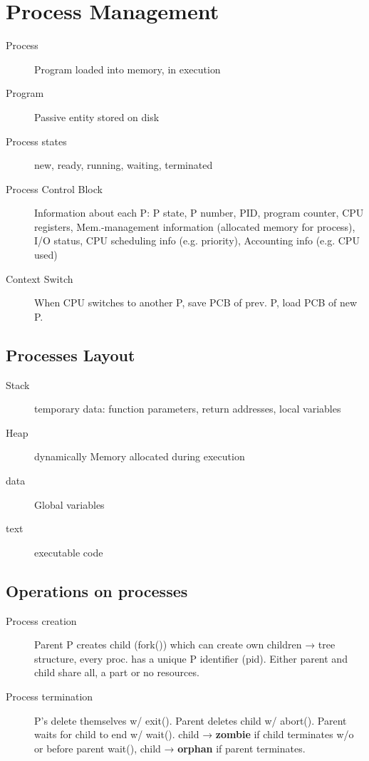 \section*{Process Management}
\begin{description}
  \item[Process] Program loaded into memory, in execution
  \item[Program] Passive entity stored on disk
  \item[Process states] new, ready, running, waiting, terminated
  \item[Process Control Block] Information about each P: P state, P number, PID, program counter, CPU registers, Mem.-management information (allocated memory for process), I/O status, CPU scheduling info (e.g. priority), Accounting info (e.g. CPU used)
  \item[Context Switch] When CPU switches to another P, save PCB of prev. P, load PCB of new P.
\end{description}

\subsection*{Processes Layout}
\begin{description}
  \item[Stack] temporary data: function parameters, return addresses, local variables
  \item[Heap] dynamically Memory allocated during execution
  \item[data] Global variables
  \item[text] executable code
\end{description}


\subsection*{Operations on processes}
\begin{description}
  \item[Process creation]Parent P creates child (fork()) which can create own children → tree structure, every proc. has a unique P identifier (pid). Either parent and child share all, a part or no resources.
  \item[Process termination] P's delete themselves w/ exit(). Parent deletes child w/ abort(). Parent waits for child to end w/ wait(). child → \textbf{zombie} if child terminates w/o or before parent wait(), child → \textbf{orphan} if parent terminates.
\end{description}

